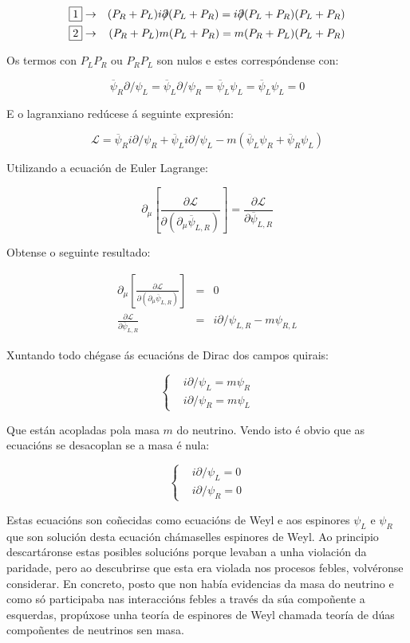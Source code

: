 \documentclass[a4paper,10pt]{article}
\newcommand{\beq}{\begin{equation}}
\newcommand{\eeq}{\end{equation}}
\newcommand{\bea}{\begin{eqnarray}}
\newcommand{\eea}{\end{eqnarray}}
\newcommand{\bc}{\begin{cases}}
\newcommand{\ec}{\end{cases}}
\newcommand{\barra}[1]{\overline{#1}}
\newcommand{\chula}[1]{\mathcal{#1}}
\newcommand{\slx}[1]{ #1\!\!\!/ }
\newcommand{\derp}[2]{\frac{\partial#1}{\partial#2}}
\begin{document}
\bea
\begin{boxed} 1 \end{boxed} &\rightarrow& ( P_R + P_L ) i \slx\partial ( P_L + P_R ) = i \slx\partial (P_L +P_R )( P_L + P_R ) \nonumber \\
\begin{boxed} 2 \end{boxed} &\rightarrow& ( P_R + P_L ) m ( P_L + P_R ) = m ( P_R + P_L )( P_L + P_R ) \nonumber
\eea

Os termos con $P_L P_R$ ou $P_R P_L$ son nulos e estes correspóndense con:

\beq
\barra\psi_R \slx\partial \psi_L = \barra\psi_L \slx\partial \psi_R = \barra\psi_L \psi_L = \barra\psi_L\psi_L = 0
\eeq

E o lagranxiano redúcese á seguinte expresión:

\beq
\chula L = \barra\psi_R i \slx\partial \psi_R + \barra\psi_L i \slx\partial \psi_L - m ( \barra\psi_L \psi_R + \barra\psi_R \psi_L )
\eeq

Utilizando a ecuación de Euler Lagrange:

\beq\label{Euler}
\partial_\mu \left[ \derp{\chula L}{ (\partial_\mu \barra\psi_{L,R}) } \right] = \derp{ \chula L}{ \barra\psi_{L,R} }
\eeq

Obtense o seguinte resultado:

\bea
\partial_\mu \left[ \derp{\chula L}{ ( \partial_\mu \barra\psi_{L,R} ) } \right] &=& 0\\
\derp{\chula L}{ \barra\psi_{L,R} } &=& i \slx\partial \psi_{L,R} - m \psi_{R,L}
\eea

Xuntando todo chégase ás ecuacións de Dirac dos campos quirais:

\beq
\bc
& i \slx\partial \psi_L = m \psi_R \\
& i \slx\partial \psi_R = m \psi_L
\ec
\eeq

Que están acopladas pola masa $m$ do neutrino. Vendo isto é obvio que as ecuacións se desacoplan se a masa é nula:

\beq
\bc
& i \slx\partial \psi_L =0 \\
& i \slx\partial \psi_R =0
\ec
\eeq

Estas ecuacións son coñecidas como ecuacións de Weyl e aos espinores $\psi_L$ e $\psi_R$ que son solución desta ecuación chámaselles espinores de Weyl. Ao principio descartáronse estas posibles solucións porque levaban a unha violación da paridade, pero ao descubrirse que esta era violada nos procesos febles, volvéronse considerar.  En concreto, posto que non había evidencias da masa do neutrino e como só participaba nas interaccións febles a través da súa compoñente a esquerdas, propúxose unha teoría de espinores de Weyl  chamada teoría de dúas compoñentes de neutrinos sen masa.
\end{document}
